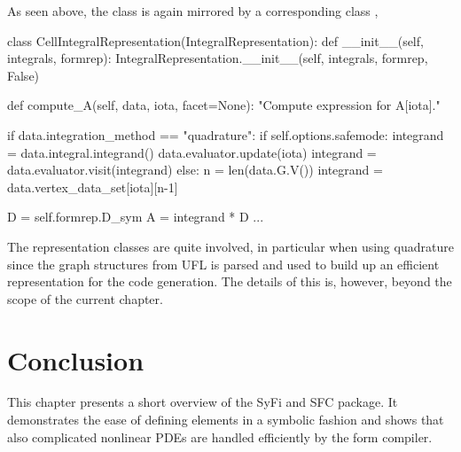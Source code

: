 As seen above, the  class is again mirrored by a corresponding class , 
\begin{python}
class CellIntegralRepresentation(IntegralRepresentation):
    def __init__(self, integrals, formrep):
        IntegralRepresentation.__init__(self, integrals, formrep, False)
    
    def compute_A(self, data, iota, facet=None):
        "Compute expression for A[iota]."
        
        if data.integration_method == "quadrature":
            if self.options.safemode:
                integrand = data.integral.integrand()
                data.evaluator.update(iota)
                integrand = data.evaluator.visit(integrand)
            else:
                n = len(data.G.V())
                integrand = data.vertex_data_set[iota][n-1]
            
            D = self.formrep.D_sym
            A = integrand * D
            ...     
\end{python}
The representation classes are quite involved, in particular when using quadrature since
the graph structures from UFL is parsed and used to build up an efficient representation 
for the code generation. The details of this is, however, beyond the scope of the current chapter.  



\section{Conclusion}

This chapter presents a short overview of the SyFi and SFC package. It demonstrates the ease of defining 
elements in a symbolic fashion and shows that also complicated nonlinear PDEs are handled efficiently
by the form compiler.  




